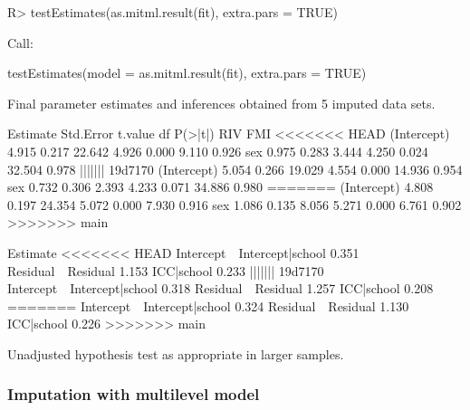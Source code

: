 \documentclass[
]{jss}
\begin{document}
\begin{CodeChunk}
\begin{CodeInput}
R> testEstimates(as.mitml.result(fit), extra.pars = TRUE)
\end{CodeInput}
\begin{CodeOutput}

Call:

testEstimates(model = as.mitml.result(fit), extra.pars = TRUE)

Final parameter estimates and inferences obtained from 5 imputed data sets.

             Estimate Std.Error   t.value        df   P(>|t|)       RIV       FMI 
<<<<<<< HEAD
(Intercept)     4.915     0.217    22.642     4.926     0.000     9.110     0.926 
sex             0.975     0.283     3.444     4.250     0.024    32.504     0.978 
||||||| 19d7170
(Intercept)     5.054     0.266    19.029     4.554     0.000    14.936     0.954 
sex             0.732     0.306     2.393     4.233     0.071    34.886     0.980 
=======
(Intercept)     4.808     0.197    24.354     5.072     0.000     7.930     0.916 
sex             1.086     0.135     8.056     5.271     0.000     6.761     0.902 
>>>>>>> main

                            Estimate 
<<<<<<< HEAD
Intercept~~Intercept|school    0.351 
Residual~~Residual             1.153 
ICC|school                     0.233 
||||||| 19d7170
Intercept~~Intercept|school    0.318 
Residual~~Residual             1.257 
ICC|school                     0.208 
=======
Intercept~~Intercept|school    0.324 
Residual~~Residual             1.130 
ICC|school                     0.226 
>>>>>>> main

Unadjusted hypothesis test as appropriate in larger samples.
\end{CodeOutput}
\end{CodeChunk}

\hypertarget{imputation-with-multilevel-model}{%
\subsubsection{Imputation with multilevel
model}\label{imputation-with-multilevel-model}}
\end{document}
